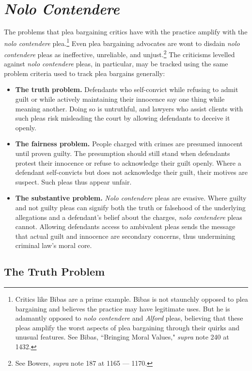 \section{\textit{Nolo Contendere}}

The problems that plea bargaining critics have with the practice amplify with the \textit{nolo contendere} plea.\footnote{Critics like Bibas are a prime example. Bibas is not staunchly opposed to plea bargaining and believes the practice may have legitimate uses. But he is adamantly opposed to \textit{nolo contendere} and \textit{Alford} pleas, believing that these pleas amplify the worst aspects of plea bargaining through their quirks and unusual features. See Bibas, ``Bringing Moral Values," \textit{supra} note 240 at 1432.} Even plea bargaining advocates are wont to disdain \textit{nolo contendere} pleas as ineffective, unreliable, and unjust.\footnote{See Bowers, \textit{supra} note 187 at 1165 — 1170.} The criticisms levelled against \textit{nolo contendere} pleas, in particular, may be tracked using the same problem criteria used to track plea bargains generally:

\begin{itemize}
    \item \textbf{The truth problem.} Defendants who self-convict while refusing to admit guilt or while actively maintaining their innocence say one thing while meaning another. Doing so is untruthful, and lawyers who assist clients with such pleas risk misleading the court by allowing defendants to deceive it openly. 
    \item \textbf{The fairness problem.} People charged with crimes are presumed innocent until proven guilty. The presumption should still stand when defendants protest their innocence or refuse to acknowledge their guilt openly. Where a defendant self-convicts but does not acknowledge their guilt, their motives are suspect. Such pleas thus appear unfair. 
    \item \textbf{The substantive problem.} \textit{Nolo contendere} pleas are evasive. Where guilty and not guilty pleas can signify both the truth or falsehood of the underlying allegations and a defendant's belief about the charges, \textit{nolo contendere} pleas cannot. Allowing defendants access to ambivalent pleas sends the message that actual guilt and innocence are secondary concerns, thus undermining criminal law's moral core. 
    
\end{itemize}

\subsection{The Truth Problem}

